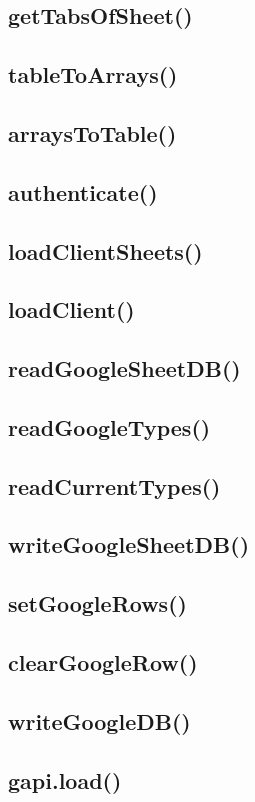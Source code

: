 \documentclass[letterpaper]{article}
\begin{document}
\subsection{getTabsOfSheet()}
\subsection{tableToArrays()}
\subsection{arraysToTable()}
\subsection{authenticate()}
\subsection{loadClientSheets()}
\subsection{loadClient()}
\subsection{readGoogleSheetDB()}
\subsection{readGoogleTypes()}
\subsection{readCurrentTypes()}
\subsection{writeGoogleSheetDB()}
\subsection{setGoogleRows()}
\subsection{clearGoogleRow()}
\subsection{writeGoogleDB()}
\subsection{gapi.load()}
\end{document}
